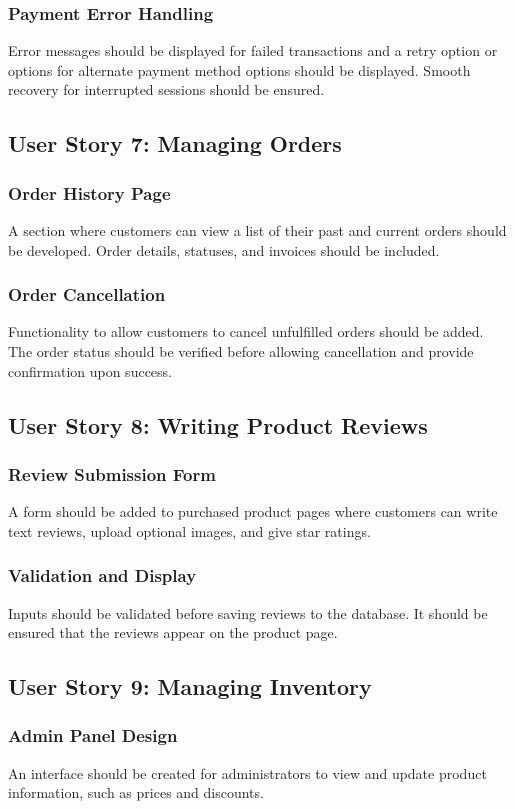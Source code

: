 \documentclass[a4paper,journal]{IEEEtran}
\begin{document}
\subsubsection{Payment Error Handling}
Error messages should be displayed for failed transactions and a retry option or
options for alternate payment method options should be displayed.
Smooth recovery for interrupted sessions should be ensured.

\subsection{User Story 7: Managing Orders}
\subsubsection{Order History Page}
A section where customers can view a list of their past and current
orders should be developed.
Order details, statuses, and invoices should be included.
\subsubsection{Order Cancellation}
Functionality to allow customers to cancel unfulfilled orders should be added.
The order status should be verified before allowing cancellation and provide
confirmation upon success.

\subsection{User Story 8: Writing Product Reviews}
\subsubsection{Review Submission Form}
A form should be added to purchased product pages where customers can write text
reviews, upload optional images, and give star ratings.
\subsubsection{Validation and Display}
Inputs should be validated before saving reviews to the database.
It should be ensured that the reviews appear on the product page.

\subsection{User Story 9: Managing Inventory}
\subsubsection{Admin Panel Design}
An interface should be created for administrators to view and update product
information, such as prices and discounts.
\end{document}
